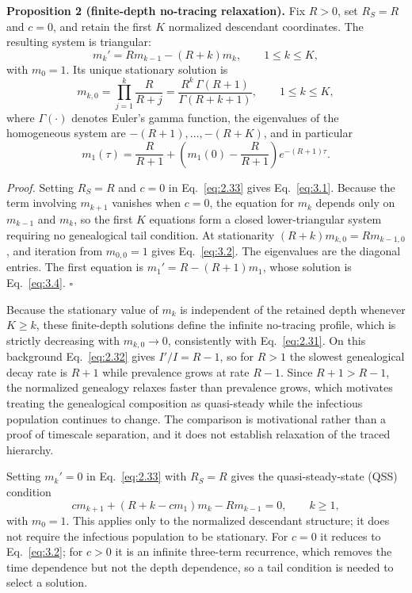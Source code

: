 \documentclass[review,12pt]{elsarticle}
\numberwithin{equation}{section}
\theoremstyle{remark}
\begin{document}
\textbf{Proposition 2 (finite-depth no-tracing relaxation).} Fix $R>0$, set $R_S=R$ and $c=0$, and retain the first $K$ normalized descendant coordinates. The resulting system is triangular:
\begin{equation}
m_k' = R m_{k-1} - (R+k)m_k, \qquad 1\leq k\leq K,
\label{eq:3.1}
\end{equation}
with $m_0=1$. Its unique stationary solution is
\begin{equation}
m_{k,0} = \prod_{j=1}^{k} \frac{R}{R+j} = \frac{R^k\,\Gamma(R+1)}{\Gamma(R+k+1)}, \qquad 1\leq k\leq K,
\label{eq:3.2}
\end{equation}
where $\Gamma(\cdot)$ denotes Euler's gamma function, the eigenvalues of the homogeneous system are $-(R+1),\ldots,-(R+K)$, and in particular
\begin{equation}
m_1(\tau) = \frac{R}{R+1} + \left(m_1(0)-\frac{R}{R+1}\right)e^{-(R+1)\tau}.
\label{eq:3.4}
\end{equation}

\textit{Proof.} Setting $R_S=R$ and $c=0$ in Eq.~\eqref{eq:2.33} gives Eq.~\eqref{eq:3.1}. Because the term involving $m_{k+1}$ vanishes when $c=0$, the equation for $m_k$ depends only on $m_{k-1}$ and $m_k$, so the first $K$ equations form a closed lower-triangular system requiring no genealogical tail condition. At stationarity $(R+k)m_{k,0}=Rm_{k-1,0}$, and iteration from $m_{0,0}=1$ gives Eq.~\eqref{eq:3.2}. The eigenvalues are the diagonal entries. The first equation is $m_1'=R-(R+1)m_1$, whose solution is Eq.~\eqref{eq:3.4}. \hfill$\square$

Because the stationary value of $m_k$ is independent of the retained depth whenever $K\geq k$, these finite-depth solutions define the infinite no-tracing profile, which is strictly decreasing with $m_{k,0}\to0$, consistently with Eq.~\eqref{eq:2.31}. On this background Eq.~\eqref{eq:2.32} gives $I'/I=R-1$, so for $R>1$ the slowest genealogical decay rate is $R+1$ while prevalence grows at rate $R-1$. Since $R+1>R-1$, the normalized genealogy relaxes faster than prevalence grows, which motivates treating the genealogical composition as quasi-steady while the infectious population continues to change. The comparison is motivational rather than a proof of timescale separation, and it does not establish relaxation of the traced hierarchy.

Setting $m_k'=0$ in Eq.~\eqref{eq:2.33} with $R_S=R$ gives the quasi-steady-state (QSS) condition
\begin{equation}
c m_{k+1} + (R+k-c m_1)m_k - R m_{k-1} = 0, \qquad k\geq1,
\label{eq:3.6}
\end{equation}
with $m_0=1$. This applies only to the normalized descendant structure; it does not require the infectious population to be stationary. For $c=0$ it reduces to Eq.~\eqref{eq:3.2}; for $c>0$ it is an infinite three-term recurrence, which removes the time dependence but not the depth dependence, so a tail condition is needed to select a solution.
\end{document}
